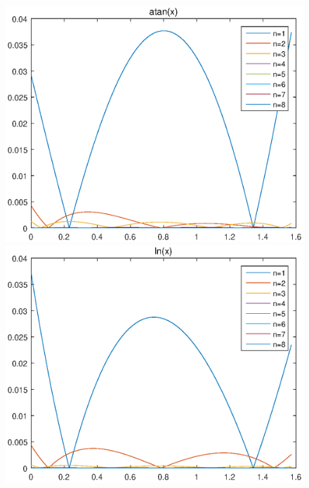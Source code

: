 \begin{figure}
\begin{minipage}{0.45\textwidth}
\end{minipage} \\
\begin{minipage}{0.45\textwidth}
\includegraphics[width = \textwidth]{prob2c.eps}
\end{minipage}
\begin{minipage}{0.45\textwidth}
\includegraphics[width = \textwidth]{prob2d.eps}
\end{minipage}
\end{figure}
